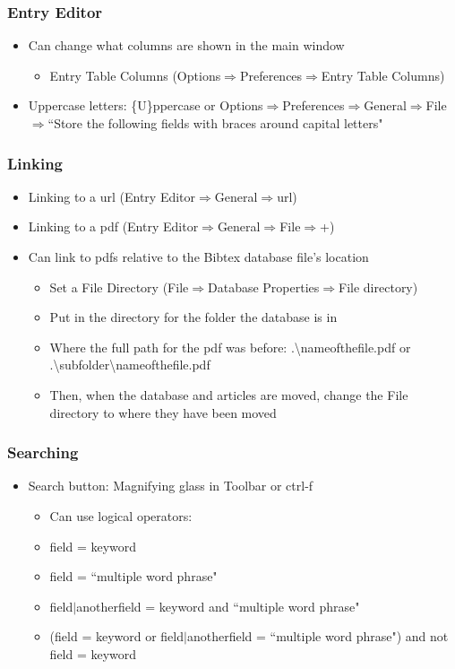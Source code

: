 \documentclass[10pt]{beamer}
\begin{document}
\begin{frame}
\frametitle{Entry Editor}
\begin{itemize}
\item Can change what columns are shown in the main window
	\begin{itemize}
	\item Entry Table Columns (Options$\Rightarrow$Preferences$\Rightarrow$Entry Table Columns)
	\end{itemize}
\item Uppercase letters: \{U\}ppercase or Options$\Rightarrow$Preferences$\Rightarrow$General$\Rightarrow$File$\Rightarrow$``Store the following fields with braces around capital letters"
\end{itemize}
\end{frame}

\begin{frame}
\frametitle{Linking}
\begin{itemize}
\item Linking to a url (Entry Editor$\Rightarrow$General$\Rightarrow$url)
\item Linking to a pdf (Entry Editor$\Rightarrow$General$\Rightarrow$File$\Rightarrow$+)
\item Can link to pdfs relative to the Bibtex database file's location
	\begin{itemize}
	\item Set a File Directory (File$\Rightarrow$Database Properties$\Rightarrow$File directory)
	\item Put in the directory for the folder the database is in
	\item Where the full path for the pdf was before: .{\textbackslash}nameofthefile.pdf or .{\textbackslash}subfolder{\textbackslash}nameofthefile.pdf
	\item Then, when the database and articles are moved, change the File directory to where they have been moved
	\end{itemize}
\end{itemize}
\end{frame}

\begin{frame}
\frametitle{Searching}
\begin{itemize}
\item Search button: Magnifying glass in Toolbar or ctrl-f
	\begin{itemize}
	\item Can use logical operators:
	\item field = keyword
	\item field = ``multiple word phrase"
	\item field$|$anotherfield = keyword and ``multiple word phrase"
	\item (field = keyword or field$|$anotherfield = ``multiple word phrase") and not field = keyword
	\end{itemize}
\end{itemize}
\end{frame}
\end{document}
